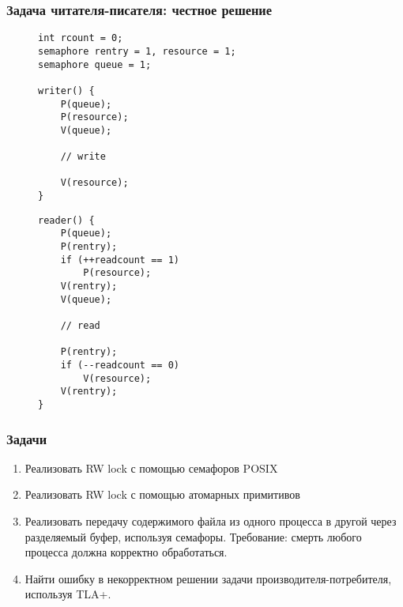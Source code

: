 \documentclass[aspectratio=169, pdf, 8pt, unicode]{beamer}
\begin{document}
\begin{frame}[fragile]
\frametitle{Задача читателя-писателя: честное решение}
\begin{figure}[H]
\begin{minipage}{0.4\textwidth}
\begin{verbatim}
int rcount = 0;
semaphore rentry = 1, resource = 1;
semaphore queue = 1;

writer() {
    P(queue);
    P(resource);
    V(queue);

    // write

    V(resource);
}
\end{verbatim}
\end{minipage}
\begin{minipage}{0.4\textwidth}
\begin{verbatim}
reader() {
    P(queue);
    P(rentry);
    if (++readcount == 1)
        P(resource);
    V(rentry);
    V(queue);

    // read

    P(rentry);
    if (--readcount == 0)
        V(resource);
    V(rentry);
}
\end{verbatim}
\end{minipage}
\end{figure}
\end{frame}

\begin{frame}[fragile]
\frametitle{Задачи}
\begin{enumerate}
\item Реализовать RW lock с помощью семафоров POSIX
\item Реализовать RW lock с помощью атомарных примитивов
\item Реализовать передачу содержимого файла из одного процесса в другой через разделяемый буфер, используя семафоры. Требование: смерть любого процесса 
должна корректно обработаться.
\item Найти ошибку в некорректном решении задачи производителя-потребителя, используя TLA+.
\end{enumerate}
\end{frame}
\end{document}
